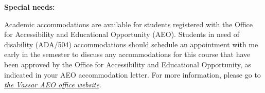 \documentclass[11pt]{article}
\newcommand{\pl}[1]{\textcolor{Regalia}{\textbf{#1}}}
\newcommand{\urlwofont}[1]{\urlstyle{same}\textit{\url{#1}}}
\begin{document}
%




\pl{Special needs:}

Academic accommodations are available for students registered with the Office for Accessibility and Educational Opportunity (AEO).  Students in need of disability (ADA/504) accommodations should schedule an appointment with me early in the semester to discuss any accommodations for this course that have been approved by the Office for Accessibility and Educational Opportunity, as indicated in your AEO accommodation letter. For more information, please go to \href{http://accessibilityandeducationalopportunity.vassar.edu/}{\textit{the Vassar AEO office website}}.\\


%
\end{document}
